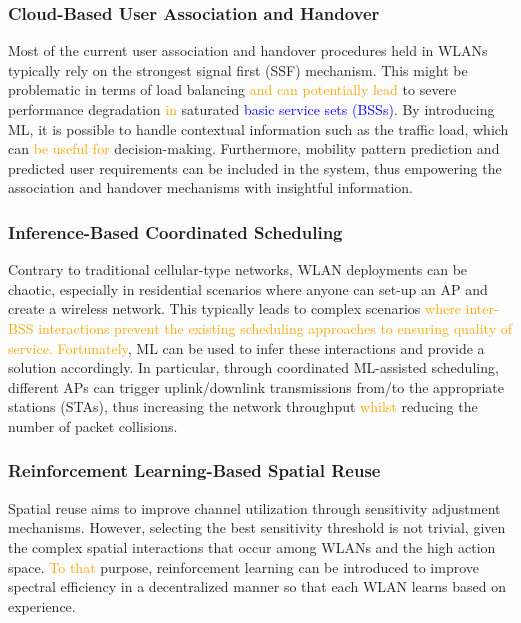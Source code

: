 \documentclass[journal]{IEEEtran}
\begin{document}
\subsubsection{Cloud-Based User Association and Handover}
Most of the current user association and handover procedures held in WLANs typically rely on the strongest signal first (SSF) mechanism. This might be problematic in terms of load balancing \textcolor{orange}{and can potentially lead} to severe performance degradation \textcolor{orange}{in} saturated \textcolor{blue}{basic service sets (BSSs)}. By introducing ML, it is possible to handle contextual information such as the traffic load, which can \textcolor{orange}{be useful for} decision-making. Furthermore, mobility pattern prediction and predicted user requirements can be included in the system, thus empowering the association and handover mechanisms with insightful information. %


\subsubsection{Inference-Based Coordinated Scheduling}
Contrary to traditional cellular-type networks, WLAN deployments can be chaotic, especially in residential scenarios where anyone can set-up an AP and create a wireless network. This typically leads to complex scenarios \textcolor{orange}{where inter-BSS interactions prevent the existing scheduling approaches to ensuring quality of service.} \textcolor{orange}{Fortunately}, ML can be used to infer these interactions and provide a solution accordingly. In particular, through coordinated ML-assisted scheduling, different APs can trigger uplink/downlink transmissions from/to the appropriate stations (STAs), thus increasing the network throughput \textcolor{orange}{whilst} reducing the number of packet collisions.

\subsubsection{Reinforcement Learning-Based Spatial Reuse} 
Spatial reuse aims to improve channel utilization through sensitivity adjustment mechanisms. However, selecting the best sensitivity threshold is not trivial, given the complex spatial interactions that occur among WLANs and the high action space. \textcolor{orange}{To that} purpose, reinforcement learning can be introduced to improve spectral efficiency in a decentralized manner so that each WLAN learns based on experience.
\end{document}
